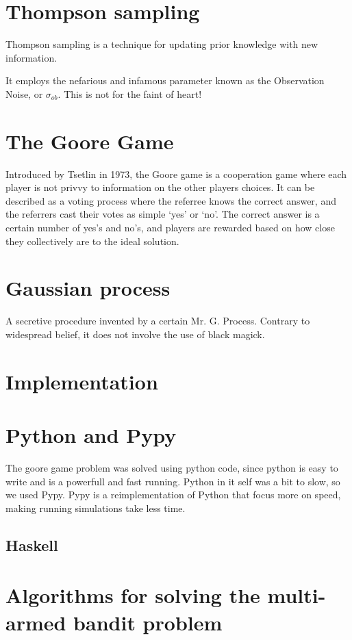 \section{Thompson sampling}
Thompson sampling is a technique for updating prior knowledge with new 
information.

It employs the nefarious and infamous parameter known as the Observation Noise, 
or $\sigma_{ob}$. This is not for the faint of heart!


\section{The Goore Game}
Introduced by Tsetlin in 1973, the Goore game is a cooperation game where each  
player is not privvy to information on the other players choices. It can be 
described as a voting process where the referree knows the correct answer, and 
the referrers cast their votes as simple ‘yes’ or ‘no’. The correct answer is a 
certain number of yes’s and no’s, and players are rewarded based on how close 
they collectively are to the ideal solution.



\section{Gaussian process}
A secretive procedure invented by a certain Mr. G. Process. Contrary to 
widespread belief, it does not involve the use of black magick.


\section{Implementation}

\section{Python and Pypy}
The goore game problem was solved using python code, since python is easy to write
and is a powerfull and fast running. Python in it self was a bit to slow, so we used
Pypy. Pypy is a reimplementation of Python that focus more on speed, making running
simulations take less time.

\subsection{Haskell}

\section{Algorithms for solving the multi-armed bandit problem}

